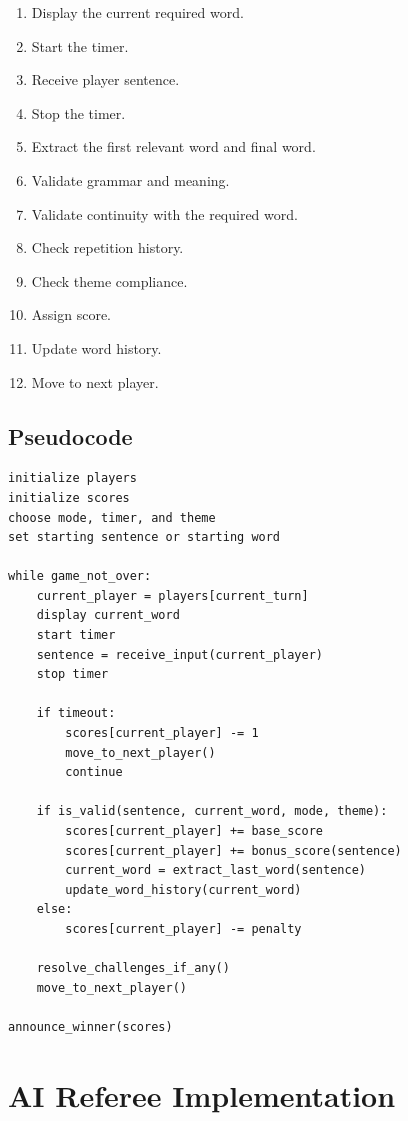 \documentclass[11pt,a4paper]{article}
\begin{document}
\begin{enumerate}
    \item Display the current required word.
    \item Start the timer.
    \item Receive player sentence.
    \item Stop the timer.
    \item Extract the first relevant word and final word.
    \item Validate grammar and meaning.
    \item Validate continuity with the required word.
    \item Check repetition history.
    \item Check theme compliance.
    \item Assign score.
    \item Update word history.
    \item Move to next player.
\end{enumerate}

\subsection{Pseudocode}

\begin{verbatim}
initialize players
initialize scores
choose mode, timer, and theme
set starting sentence or starting word

while game_not_over:
    current_player = players[current_turn]
    display current_word
    start timer
    sentence = receive_input(current_player)
    stop timer

    if timeout:
        scores[current_player] -= 1
        move_to_next_player()
        continue

    if is_valid(sentence, current_word, mode, theme):
        scores[current_player] += base_score
        scores[current_player] += bonus_score(sentence)
        current_word = extract_last_word(sentence)
        update_word_history(current_word)
    else:
        scores[current_player] -= penalty

    resolve_challenges_if_any()
    move_to_next_player()

announce_winner(scores)
\end{verbatim}

\section{AI Referee Implementation}
\end{document}
